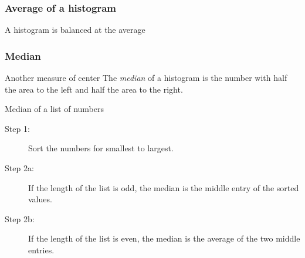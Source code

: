 \documentclass[handout]{beamer}
\begin{document}


   \begin{frame}
   \frametitle{Average of a histogram}
   \begin{center}
   \end{center}
   A histogram is balanced at the average
   \end{frame}


   \begin{frame} \frametitle{Median}

   \begin{block}
   {Another measure of center}
   The {\em median} of a histogram is the number with half the area to
   the left and half the area to the right.

   \end{block}

   \begin{block}
   {Median of a list of numbers}

   \begin{description}
   \item[Step 1:] Sort the numbers for smallest to largest.

   \item[Step 2a:] If the length of the list is odd, the median is the middle
   entry of the sorted values.

   \item[Step 2b:] If the length of the list is even, the median is the average
   of the two middle entries.

   \end{description}
   \end{block}
   \end{frame}

\end{document}
